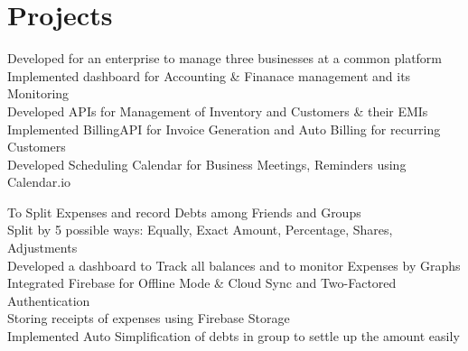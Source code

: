 \documentclass[]{jaydeep-resume-openfont}
\begin{document}
\begin{minipage}[t]{0.70\textwidth}

\section{Projects}

\textbullet{} Developed for an enterprise to manage three businesses at a common platform \\
\textbullet{} Implemented dashboard for Accounting \& Finanace management and its Monitoring \\
\textbullet{} Developed APIs for Management of Inventory and Customers \& their EMIs  \\
\textbullet{} Implemented BillingAPI for Invoice Generation and Auto Billing for recurring Customers  \\
\textbullet{} Developed Scheduling Calendar for Business Meetings, Reminders using Calendar.io \\
\sectionsep

\textbullet{} To Split Expenses and record Debts among Friends and Groups\\
\textbullet{} Split by 5 possible ways: Equally, Exact Amount, Percentage, Shares, Adjustments \\
\textbullet{} Developed a dashboard to Track all balances  and to monitor Expenses by Graphs\\
\textbullet{} Integrated Firebase for Offline Mode \& Cloud Sync and Two-Factored Authentication\\
\textbullet{} Storing receipts of expenses using Firebase Storage\\
\textbullet{} Implemented Auto Simplification of debts in group to settle up the amount easily \\
\sectionsep


\end{minipage}
\end{document}
